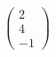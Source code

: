\documentclass[preview]{standalone}
\begin{document}
\begin{align*}
\begin{pmatrix} 2 \\ 4 \\ -1 \end{pmatrix}
\end{align*}
\end{document}
